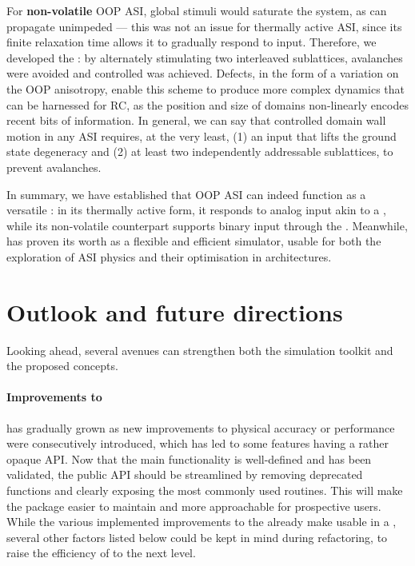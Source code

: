 For \textbf{non-volatile} OOP ASI, global stimuli would saturate the system, as  can propagate unimpeded --- this was not an issue for thermally active ASI, since its finite relaxation time allows it to gradually respond to input.
Therefore, we developed the : by alternately stimulating two interleaved sublattices, avalanches were avoided and controlled  was achieved.
Defects, in the form of a variation on the OOP anisotropy, enable this scheme to produce more complex dynamics that can be harnessed for RC, as the position and size of domains non-linearly encodes recent bits of information.
In general, we can say that controlled domain wall motion in any ASI requires, at the very least, (1) an input that lifts the ground state degeneracy and (2) at least two independently addressable sublattices, to prevent avalanches. \\\par

In summary, we have established that OOP ASI can indeed function as a versatile : in its thermally active form, it responds to analog input akin to a , while its non-volatile counterpart supports binary input through the .
Meanwhile, \hotspice has proven its worth as a flexible and efficient simulator, usable for both the exploration of ASI physics and their optimisation in  architectures.

\section{Outlook and future directions}
Looking ahead, several avenues can strengthen both the \hotspice simulation toolkit and the proposed  concepts.

\paragraph{Improvements to \hotspice}
\hotspice has gradually grown as new improvements to physical accuracy or performance were consecutively introduced, which has led to some features having a rather opaque API.
Now that the main functionality is well-defined and has been validated, the public API should be streamlined by removing deprecated functions and clearly exposing the most commonly used routines. %
This will make the package easier to maintain and more approachable for prospective users.
While the various implemented improvements to the  already make \hotspice usable in a , several other factors listed below could be kept in mind during refactoring, to raise the efficiency of \hotspice to the next level. \\\par

